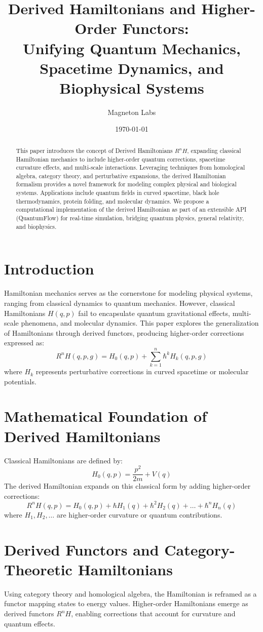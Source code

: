 \documentclass{article}
\title{Derived Hamiltonians and Higher-Order Functors: \\
Unifying Quantum Mechanics, Spacetime Dynamics, and Biophysical Systems}
\author{Magneton Labs}
\date{\today}
\begin{document}
\maketitle

\begin{abstract}
This paper introduces the concept of Derived Hamiltonians \( R^nH \), expanding classical Hamiltonian mechanics to include higher-order quantum corrections, spacetime curvature effects, and multi-scale interactions. Leveraging techniques from homological algebra, category theory, and perturbative expansions, the derived Hamiltonian formalism provides a novel framework for modeling complex physical and biological systems. Applications include quantum fields in curved spacetime, black hole thermodynamics, protein folding, and molecular dynamics. We propose a computational implementation of the derived Hamiltonian as part of an extensible API (QuantumFlow) for real-time simulation, bridging quantum physics, general relativity, and biophysics.
\end{abstract}

\tableofcontents

\section{Introduction}
Hamiltonian mechanics serves as the cornerstone for modeling physical systems, ranging from classical dynamics to quantum mechanics. However, classical Hamiltonians \( H(q, p) \) fail to encapsulate quantum gravitational effects, multi-scale phenomena, and molecular dynamics. This paper explores the generalization of Hamiltonians through derived functors, producing higher-order corrections expressed as:
\[
R^nH(q, p, g) = H_0(q, p) + \sum_{k=1}^n \hbar^k H_k(q, p, g)
\]
where \( H_k \) represents perturbative corrections in curved spacetime or molecular potentials.

\section{Mathematical Foundation of Derived Hamiltonians}
Classical Hamiltonians are defined by:
\[
H_0(q, p) = \frac{p^2}{2m} + V(q)
\]
The derived Hamiltonian expands on this classical form by adding higher-order corrections:
\[
R^nH(q, p) = H_0(q, p) + \hbar H_1(q) + \hbar^2 H_2(q) + \dots + \hbar^n H_n(q)
\]
where \( H_1, H_2, \dots \) are higher-order curvature or quantum contributions.

\section{Derived Functors and Category-Theoretic Hamiltonians}
Using category theory and homological algebra, the Hamiltonian is reframed as a functor mapping states to energy values. Higher-order Hamiltonians emerge as derived functors \( R^nH \), enabling corrections that account for curvature and quantum effects.
\end{document}
